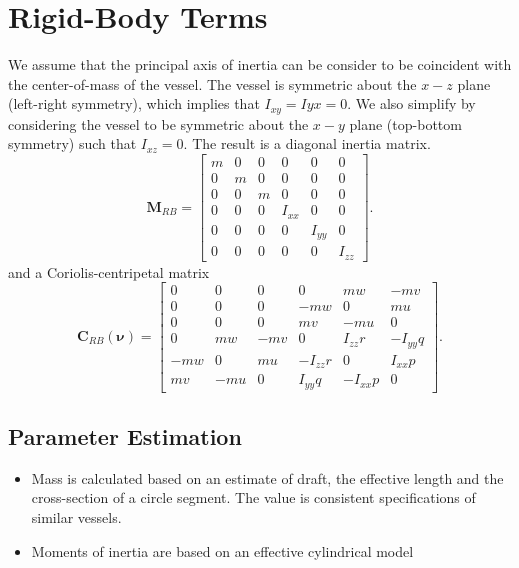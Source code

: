 \documentclass[11pt, letterpaper]{article}
\begin{document}
\section{Rigid-Body Terms}

We assume that the principal axis of inertia can be consider to be coincident with the center-of-mass of the vessel.  The vessel is symmetric about the $x-z$ plane (left-right symmetry), which implies that $I_{xy}=I{yx}=0$.  We also simplify by considering the vessel to be symmetric about the $x-y$ plane (top-bottom symmetry) such that $I_{xz}=0$.  The result is a diagonal inertia matrix.
\begin{equation}
\bm{M}_{RB}= \left[ 
\begin{array}{ccccccc}
m & 0 & 0 & 0 & 0 & 0 \\
0 & m & 0 & 0 & 0 & 0 \\
0 & 0 & m & 0 & 0 & 0 \\
0 & 0 & 0 & I_{xx} & 0 & 0 \\
0 & 0 & 0 & 0 & I_{yy} & 0 \\
0 & 0 & 0 & 0 & 0 & I_{zz} 
\end{array} \right].
\end{equation}
and a Coriolis-centripetal matrix
\begin{equation}
\bm{C}_{RB}(\bm{\nu})= \left[ 
\begin{array}{ccccccc}
  0 & 0 & 0 & 0 & mw & -mv \\
  0 & 0 & 0 & -mw & 0 & mu \\
  0 & 0 & 0 & mv & -mu & 0 \\
  0 & mw  & -mv & 0 & I_{zz}r & -I_{yy}q \\
  -mw & 0 & mu & -I_{zz}r & 0 & I_{xx}p \\
  mv & -mu & 0 & I_{yy}q & -I_{xx}p  & 0
\end{array} \right].
\end{equation}

\subsection{Parameter Estimation}

\begin{itemize}
\item Mass is calculated based on an estimate of draft, the effective length and the cross-section of a circle segment.  The value is consistent specifications of similar vessels.
\item Moments of inertia are based on an effective cylindrical model
\end{itemize}
\end{document}
